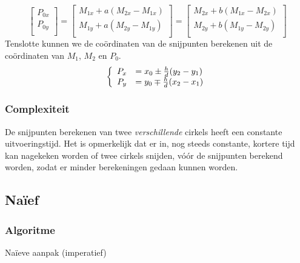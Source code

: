 \[
\begin{bmatrix}
P_{0x}\\P_{0y}\\
\end{bmatrix}
=
\begin{bmatrix}
M_{1x} + a(M_{2x}-M_{1x})\\
M_{1y} + a(M_{2y}-M_{1y})\\
\end{bmatrix}
=
\begin{bmatrix}
M_{2x} + b(M_{1x}-M_{2x})\\
M_{2y} + b(M_{1y}-M_{2y})\\
\end{bmatrix}
\]
Tenslotte kunnen we de co\"ordinaten van de snijpunten berekenen uit de co\"ordinaten van $M_1$, $M_2$ en $P_0$.
\[
\left\{
\begin{array}{c l}
P_x &= x_0 \pm \frac{h}{d}(y_2-y_1)\\
P_y &= y_0 \mp \frac{h}{d}(x_2-x_1)
\end{array}
\right.
\]

\subsubsection{Complexiteit}
De snijpunten berekenen van twee \emph{verschillende} cirkels heeft een constante uitvoeringstijd. Het is opmerkelijk dat er in, nog steeds constante, kortere tijd kan nagekeken worden of twee cirkels snijden, v\'o\'or de snijpunten berekend worden, zodat er minder berekeningen gedaan kunnen worden.


\subsection{Na\"ief}
\label{sec:naief}

\subsubsection{Algoritme}

\begin{algorithm}[H]
  \SetAlgoLined
  \caption{Na\"ieve aanpak (imperatief)}
  \label{algo:naive}
\end{algorithm}

